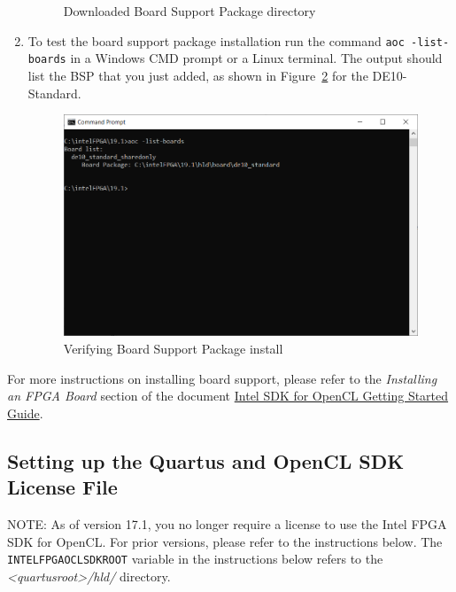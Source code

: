 \documentclass[11pt, twoside, pdftex]{article}
\begin{document}
\begin{enumerate}
\begin{figure} [H]
\begin{center}
	\end{center}
	\caption{Downloaded Board Support Package directory}
	\label{fig:downloaded_bsp_directory}
	\end{figure}
\item To test the board support package installation run the command \texttt{aoc -list-boards} in a Windows CMD prompt or a Linux terminal. 
The output should list the BSP that you just added, as shown in Figure~\ref{fig:verify_bsp_install} for the DE10-Standard.
	\begin{figure} [H]
	\begin{center}
	\includegraphics[scale = 0.5]{figures/fig_aoc_list_boards.png}
	\end{center}
	\caption{Verifying Board Support Package install}
	\label{fig:verify_bsp_install}
	\end{figure}
\end{enumerate}

For more instructions on installing board support, please refer to the \textit{Installing an FPGA Board} section of the document \href{https://www.altera.com/documentation/mwh1391807309901.html}{Intel SDK for OpenCL Getting Started Guide}.

\subsection{Setting up the Quartus and OpenCL SDK License File}

NOTE: As of version 17.1, you no longer require a license to use the Intel FPGA SDK for OpenCL. For prior versions, please refer to the instructions below.
The \texttt{INTELFPGAOCLSDKROOT} variable in the instructions below refers to the \textit{<quartusroot>/hld/} directory.
\end{document}
